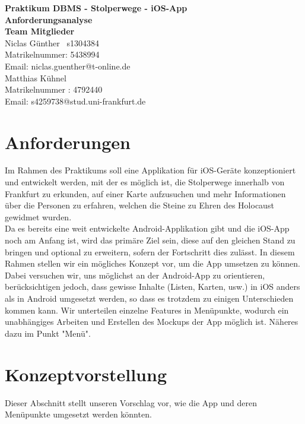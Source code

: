 \documentclass[a4paper, 11pt]{report}
\begin{document}
	\noindent
	\thispagestyle{empty}
	\Large\textbf{Praktikum DBMS - Stolperwege - iOS-App}\\
	\large\textbf{Anforderungsanalyse} \\ \newline
	\large \textbf{Team Mitglieder} \\ \newline
	Niclas G\"unther \
	s1304384\\
	Matrikelnummer: 5438994\\
	Email: niclas.guenther@t-online.de \\ \newline
	Matthias Kühnel\\
	Matrikelnummer : 4792440 \\
	Email: s4259738@stud.uni-frankfurt.de \\
	\newpage
	
	\section*{Anforderungen}
	
	Im Rahmen des Praktikums soll eine Applikation für iOS-Geräte konzeptioniert und entwickelt werden, mit der es möglich ist, die Stolperwege innerhalb von Frankfurt zu erkunden, auf einer Karte aufzusuchen und mehr Informationen über die Personen zu erfahren, welchen die Steine zu Ehren des Holocaust gewidmet wurden.\\
	Da es bereits eine weit entwickelte Android-Applikation gibt und die iOS-App noch am Anfang ist, wird das primäre Ziel sein, diese auf den gleichen Stand zu bringen und optional zu erweitern, sofern der Fortschritt dies zulässt. In diesem Rahmen stellen wir ein mögliches Konzept vor, um die App umsetzen zu können. Dabei versuchen wir, uns möglichst an der Android-App zu orientieren, berücksichtigen jedoch, dass gewisse Inhalte (Listen, Karten, usw.) in iOS anders als in Android umgesetzt werden, so dass es trotzdem zu einigen Unterschieden kommen kann. Wir unterteilen einzelne Features in Menüpunkte, wodurch ein unabhängiges Arbeiten und Erstellen des Mockups der App möglich ist. Näheres dazu im Punkt "Menü".
	
	\section*{Konzeptvorstellung}
	
	Dieser Abschnitt stellt unseren Vorschlag vor, wie die App und deren Menüpunkte umgesetzt werden könnten.
	
\end{document}
